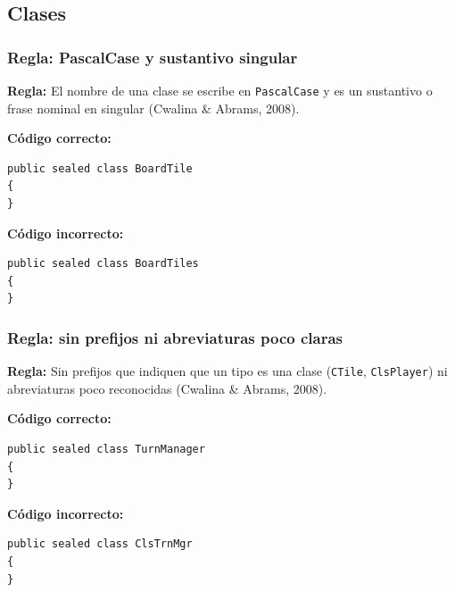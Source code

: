 \subsection{Clases}

\subsubsection{Regla: PascalCase y sustantivo singular}

\textbf{Regla:} El nombre de una clase se escribe en \texttt{PascalCase} y es un sustantivo o frase nominal en singular (Cwalina \& Abrams, 2008).

\textbf{Código correcto:}
\begin{lstlisting}[style=csharpstyle]
public sealed class BoardTile
{
}
\end{lstlisting}

\textbf{Código incorrecto:}
\begin{lstlisting}[style=csharpstyle]
public sealed class BoardTiles
{
}
\end{lstlisting}

\subsubsection{Regla: sin prefijos ni abreviaturas poco claras}

\textbf{Regla:} Sin prefijos que indiquen que un tipo es una clase (\texttt{CTile}, \texttt{ClsPlayer}) ni abreviaturas poco reconocidas (Cwalina \& Abrams, 2008).

\textbf{Código correcto:}
\begin{lstlisting}[style=csharpstyle]
public sealed class TurnManager
{
}
\end{lstlisting}

\textbf{Código incorrecto:}
\begin{lstlisting}[style=csharpstyle]
public sealed class ClsTrnMgr
{
}
\end{lstlisting}
